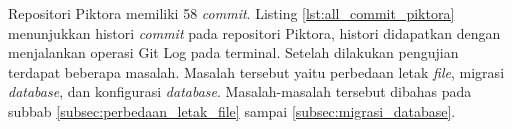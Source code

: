 
Repositori Piktora memiliki 58 \textit{commit}. Listing \ref{lst:all_commit_piktora} menunjukkan histori \textit{commit} pada repositori Piktora, histori didapatkan dengan menjalankan operasi Git Log pada terminal. Setelah dilakukan pengujian terdapat beberapa masalah. Masalah tersebut yaitu perbedaan letak \textit{file}, migrasi \textit{database}, dan konfigurasi \textit{database}. Masalah-masalah tersebut dibahas pada subbab \ref{subsec:perbedaan_letak_file} sampai \ref{subsec:migrasi_database}.

